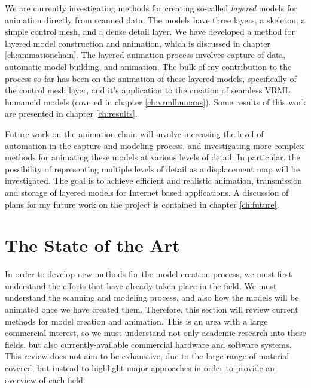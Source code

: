 \documentclass[10pt,oneside,fleqn,a4paper]{book}
\begin{document}
We are currently investigating methods for creating so-called {\it layered} models for animation directly from scanned data. The models have three layers, a skeleton, a simple control mesh, and a dense detail layer. We have developed a method for layered model construction and animation, which is discussed in chapter \ref{ch:animationchain}. The layered animation process involves capture of data, automatic model building, and animation. The bulk of my contribution to the process so far has been on the animation of these layered models, specifically of the control mesh layer, and it's application to the creation of seamless VRML humanoid models (covered in chapter \ref{ch:vrmlhumans}). Some results of this work are presented in chapter \ref{ch:results}.

Future work on the animation chain will involve increasing the level of automation in the capture and modeling process, and investigating more complex methods for animating these models at various levels of detail. In particular, the possibility of representing multiple levels of detail as a displacement map will be investigated. The goal is to achieve efficient and realistic animation, transmission and storage of layered models for Internet based applications. A discussion of plans for my future work on the project is contained in chapter \ref{ch:future}.

\chapter{\label{ch:review}The State of the Art}

In order to develop new methods for the model creation process, we must first understand the efforts that have already taken place in the field. We must understand the scanning and modeling process, and also how the models will be animated once we have created them. Therefore, this section will review current methods for model creation and animation. This is an area with a large commercial interest, so we must understand not only academic research into these fields, but also currently-available commercial hardware and software systems. This review does not aim to be exhaustive, due to the large range of material covered, but instead to highlight major approaches in order to provide an overview of each field.
\end{document}
